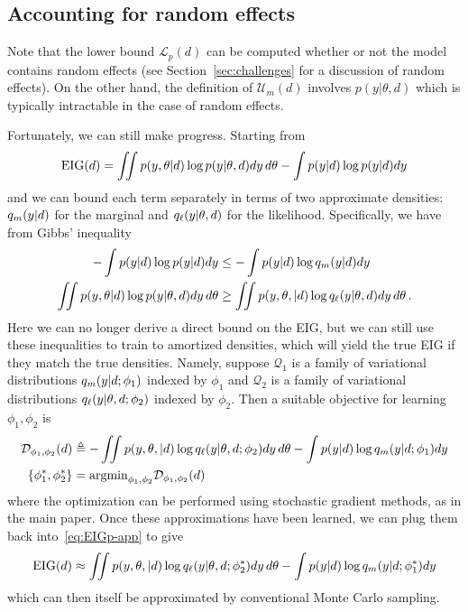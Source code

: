 \subsection{Accounting for random effects}
Note that the lower bound $\mathcal{L}_p(d)$ can be computed whether or not the model contains random effects (see Section~\ref{sec:challenges} for a discussion of random effects). On the other hand, the definition of $\mathcal{U}_m(d)$ involves $p(y|\theta,d)$ which is typically intractable in the case of random effects.

Fortunately, we can still make progress. Starting from
\begin{equation}
\label{eq:EIGp-app}
	\text{EIG}(d) = \iint  p(y, \theta | d) \log p(y|\theta, d) dy\,d\theta - \int p(y | d) \log p(y | d) dy
\end{equation}
and we can bound each term separately in terms of two approximate densities: $q_m(y|d)$ for the marginal and $q_\ell(y|\theta,d)$ for the likelihood. Specifically,
we have from Gibbs' inequality
\begin{align}
	-\int p(y | d) \log p(y | d) dy &\le -\int  p(y|d)\log q_m(y|d) dy \\
	\iint p(y, \theta |d) \log p(y|\theta,d) dy\,d\theta & \ge \iint p(y, \theta, | d) \log q_\ell(y|\theta, d) dy\,d\theta \,.
\end{align}
Here we can no longer derive a direct bound on the EIG, but we can still
use these inequalities to train to amortized densities, which will yield the
true EIG if they match the true densities.
Namely, suppose $\mathcal{Q}_1$ is a family of variational distributions  $q_m(y|d; \phi_1)$ indexed by $\phi_1$ 
and $\mathcal{Q}_2$ is a family of variational distributions $q_\ell(y|\theta,d; \phi_2)$ indexed by $\phi_2$. Then a suitable objective for learning $\phi_1, \phi_2$ is
\begin{align}
\mathcal{D}_{\phi_1, \phi_2}(d) &\triangleq
- \iint  p(y, \theta, | d) \log q_\ell(y|\theta, d; \phi_2)dy\,d\theta 
-\int p(y | d) \log q_m(y | d; \phi_1)dy  \\
\{\phi_1^*, \phi_2^*\}	&= \text{argmin}_{\phi_1, \phi_2} \mathcal{D}_{\phi_1, \phi_2}(d)
	\end{align}
where the optimization can be performed using stochastic gradient methods, as in the main paper. Once these approximations have been learned, we can plug
them back into~\eqref{eq:EIGp-app} to give
\begin{equation}
	 \text{EIG}(d) \approx  \iint  p(y, \theta, | d)\log q_\ell(y|\theta, d; \phi_2^*) dy\,d\theta 
	 -\int p(y | d) \log q_m(y | d; \phi_1^*) dy
\end{equation}
which can then itself be approximated by conventional Monte Carlo
sampling.

